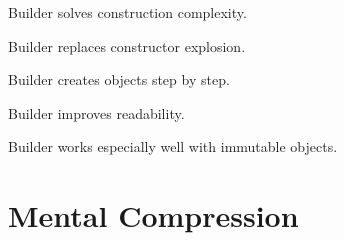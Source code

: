 \documentclass[11pt,a4paper]{book}
\begin{document}
\begin{rosettarule}

Builder solves construction
complexity.

\end{rosettarule}


\begin{rosettarule}

Builder replaces constructor
explosion.

\end{rosettarule}


\begin{rosettarule}

Builder creates objects
step by step.

\end{rosettarule}


\begin{rosettarule}

Builder improves readability.

\end{rosettarule}


\begin{rosettarule}

Builder works especially well
with immutable objects.

\end{rosettarule}


\section{Mental Compression}
\end{document}
